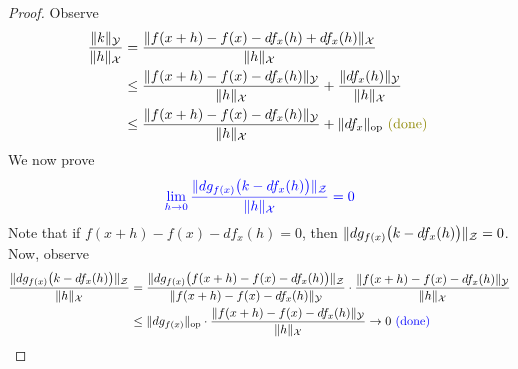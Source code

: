 \documentclass{report}
\begin{document}
\begin{proof}
Observe 
\begin{align*}
\frac{\norm{k}_\mathcal{Y}}{\norm{h}_\mathcal{X}}&= \frac{\norm{f(x+h)-f(x)-df_x(h)+df_x(h)}_\mathcal{X}}{\norm{h}_\mathcal{X}}\\
&\leq \frac{\norm{f(x+h)-f(x)-df_x(h)}_\mathcal{Y}}{\norm{h}_\mathcal{X}}+\frac{\norm{df_x(h)}_\mathcal{Y}}{\norm{h}_\mathcal{X}}\\
&\leq \frac{\norm{f(x+h)-f(x)-df_x(h)}_\mathcal{Y}}{\norm{h}_\mathcal{X}} + \norm{df_x}_\text{op} \odone
\end{align*}
We now prove 
\begin{align*}
\textcolor{blue}{\lim_{h\to 0} \frac{\| dg_{f(x)}\big(k-df_x(h) \big) \|_\mathcal{Z}}{\| h \|_\mathcal{X}}=0}
\end{align*}
Note that if $f(x+h)-f(x)-df_x(h)=0$, then $\| dg_{f(x)}\big(k-df_x(h) \big) \|_\mathcal{Z}=0$. Now, observe 
\begin{align*}
\frac{\| dg_{f(x)}\big(k-df_x(h) \big) \|_\mathcal{Z}}{\| h \|_\mathcal{X}}&= \frac{\| dg_{f(x)}\big(f(x+h)-f(x)-df_x(h) \big) \|_\mathcal{Z}}{\| f(x+h)-f(x)-df_x(h) \|_\mathcal{Y}}\cdot \frac{\| f(x+h)-f(x)-df_x(h) \|_\mathcal{Y}}{\| h \|_\mathcal{X}}\\
&\leq \| dg_{f(x)} \|_\text{op}\cdot \frac{\| f(x+h)-f(x)-df_x(h) \|_\mathcal{Y}}{\| h \|_\mathcal{X}}\to 0 \textcolor{blue}{\text{ (done) }}
\end{align*}
\end{proof}
\end{document}

